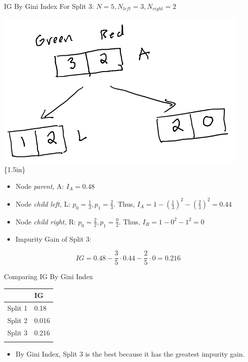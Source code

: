 \documentclass[
  ignorenonframetext,
]{beamer}
\providecommand{\tightlist}{%
  \setlength{\itemsep}{0pt}\setlength{\parskip}{0pt}}\usepackage{longtable,booktabs,array}
\begin{document}
\begin{frame}{IG By Gini Index}
\label{ig-by-gini-index-1}
For Split 3: \(N = 5, N_{left} =3, N_{right} = 2\)

\includegraphics{images/im2.png}\{1.5in\}

\begin{itemize}
\item
  Node \emph{parent,} A: \(I_{A} = 0.48\)
\item
  Node \emph{child left,} L: \(p_0 = \frac{1}{3}, p_1 = \frac{2}{3}\).
  Thus, \(I_{A} = 1-(\frac{1}{3})^2 -(\frac{2}{3})^2 = 0.44\)
\item
  Node \emph{child right,} R: \(p_0 = \frac{2}{2}, p_1 = \frac{0}{2}\).
  Thus, \(I_{R} = 1-0^2-1^2 = 0\)
\item
  Impurity Gain of Split 3:
\end{itemize}

\[IG = 0.48 - \frac{3}{5} \cdot 0.44 - \frac{2}{5} \cdot 0 = 0.216\]
\end{frame}

\begin{frame}{Comparing IG By Gini Index}
\label{comparing-ig-by-gini-index}
\begin{longtable}[]{@{}ll@{}}
\toprule\noalign{}
& IG \\
\midrule\noalign{}
\endhead
Split 1 & 0.18 \\
Split 2 & 0.016 \\
Split 3 & 0.216 \\
\bottomrule\noalign{}
\end{longtable}

\begin{itemize}
\tightlist
\item
  By Gini Index, Split 3 is the best because it has the greatest
  impurity gain.
\end{itemize}
\end{frame}
\end{document}
